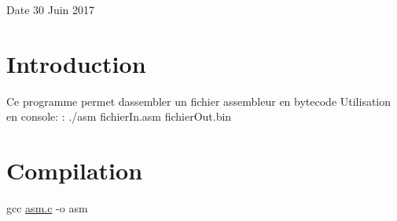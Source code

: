 \begin{DoxyDate}{Date}
30 Juin 2017
\end{DoxyDate}
\hypertarget{index_intro_sec}{}\section{Introduction}\label{index_intro_sec}
Ce programme permet d\textquotesingle{}assembler un fichier assembleur en bytecode Utilisation en console\+: \+: ./asm fichier\+In.\+asm fichier\+Out.\+bin\hypertarget{index_Compilation}{}\section{Compilation}\label{index_Compilation}
gcc \hyperlink{asm_8c}{asm.\+c} -\/o asm 